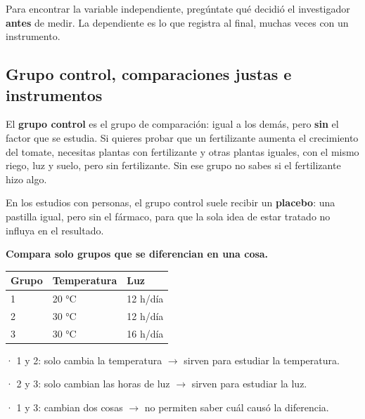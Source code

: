 \begin{clave}[{Recuerda}] Para encontrar la variable independiente, pregúntate qué decidió el investigador \textbf{antes} de medir. La dependiente es lo que registra al final, muchas veces con un instrumento.\end{clave}
\subsection{Grupo control, comparaciones justas e instrumentos}
El \textbf{grupo control} es el grupo de comparación: igual a los demás, pero \textbf{sin} el factor que se estudia. Si quieres probar que un fertilizante aumenta el crecimiento del tomate, necesitas plantas con fertilizante y otras plantas iguales, con el mismo riego, luz y suelo, pero sin fertilizante. Sin ese grupo no sabes si el fertilizante hizo algo.

 

En los estudios con personas, el grupo control suele recibir un \textbf{placebo}: una pastilla igual, pero sin el fármaco, para que la sola idea de estar tratado no influya en el resultado.

 

\textbf{Compara solo grupos que se diferencian en una cosa.}

 
\begin{center}\small
\begin{tabular}{@{}lll@{}}
\toprule
\textbf{Grupo} & \textbf{Temperatura} & \textbf{Luz} \\
\midrule
1 & 20 °C & 12 h/día \\
2 & 30 °C & 12 h/día \\
3 & 30 °C & 16 h/día \\
\bottomrule
\end{tabular}
\end{center}
 

· 1 y 2: solo cambia la temperatura \ensuremath{\rightarrow} sirven para estudiar la temperatura.\par · 2 y 3: solo cambian las horas de luz \ensuremath{\rightarrow} sirven para estudiar la luz.\par · 1 y 3: cambian dos cosas \ensuremath{\rightarrow} no permiten saber cuál causó la diferencia.

